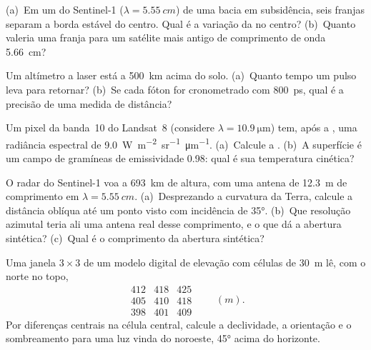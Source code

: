 \begin{exercise}[$\star$]\label{exo:b3:remote-sensing-gis:3}
(a)~Em um  do Sentinel-1 ($\lambda = \qty{5.55}{cm}$) de uma
bacia em subsidência, seis franjas separam a borda estável do centro.
Qual é a variação da  no centro? (b)~Quanto valeria uma franja
para um satélite mais antigo de comprimento de onda \qty{5.66}{cm}?
\end{exercise}

\begin{exercise}[$\star$]\label{exo:b3:remote-sensing-gis:4}
Um altímetro a laser está a \qty{500}{km} acima do solo. (a)~Quanto tempo um
pulso leva para retornar? (b)~Se cada fóton for cronometrado com \qty{800}{ps}, qual
é a precisão de uma medida de distância?
\end{exercise}

\begin{exercise}[$\star\star$]\label{exo:b3:remote-sensing-gis:5}
Um pixel da banda~10 do Landsat~8 (considere $\lambda = \qty{10.9}{\micro\metre}$)
tem, após a , uma radiância espectral de
\qty{9.0}{W.m^{-2}.sr^{-1}.\micro\metre^{-1}}. (a)~Calcule a
. (b)~A superfície é um campo de gramíneas de emissividade 0.98: qual é
sua temperatura cinética?
\end{exercise}

\begin{exercise}[$\star\star$]\label{exo:b3:remote-sensing-gis:6}
O radar do Sentinel-1 voa a \qty{693}{km} de altura, com uma antena de \qty{12.3}{m}
de comprimento em $\lambda = \qty{5.55}{cm}$. (a)~Desprezando a curvatura da
Terra, calcule a distância oblíqua até um ponto visto com incidência de
\ang{35}. (b)~Que resolução azimutal teria ali uma antena real desse comprimento, e
o que dá a abertura sintética? (c)~Qual é o comprimento da
abertura sintética?
\end{exercise}

\begin{exercise}[$\star\star$]\label{exo:b3:remote-sensing-gis:7}
Uma janela $3\times3$ de um modelo digital de elevação com células de \qty{30}{m}
lê, com o norte no topo,
\[
\begin{matrix} 412 & 418 & 425 \\ 405 & 410 & 418 \\ 398 & 401 & 409 \end{matrix}
\qquad (\unit{m}).
\]
Por diferenças centrais na célula central, calcule a declividade, a
orientação e o sombreamento para uma luz vinda do noroeste, \ang{45} acima do
horizonte.
\end{exercise}

